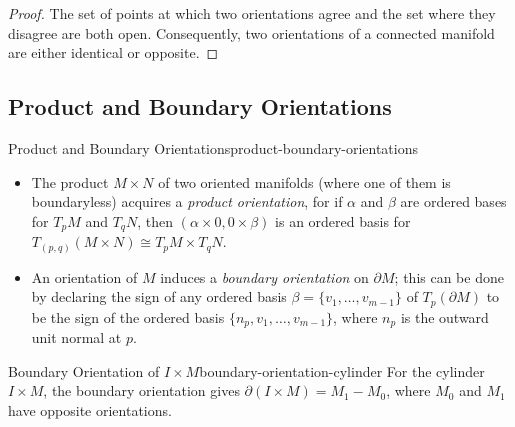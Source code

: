 \begin{proof}
    The set of points at which two orientations agree and the set where they disagree are both open. Consequently, two orientations of a connected manifold are either identical or opposite.
\end{proof}

\subsection{Product and Boundary Orientations}

\begin{remark}{Product and Boundary Orientations}{product-boundary-orientations}
    \begin{itemize}
        \item The product $M \times N$ of two oriented manifolds (where one of them is boundaryless) acquires a \emph{product orientation}, for if $\alpha$ and $\beta$ are ordered bases for $T_p M$ and $T_q N$, then $(\alpha \times 0, 0 \times \beta)$ is an ordered basis for $T_{(p,q)}(M \times N) \cong T_p M \times T_q N$.

        \item An orientation of $M$ induces a \emph{boundary orientation} on $\partial M$; this can be done by declaring the sign of any ordered basis $\beta = \{v_1, \ldots, v_{m-1}\}$ of $T_p(\partial M)$ to be the sign of the ordered basis $\{n_p, v_1, \ldots, v_{m-1}\}$, where $n_p$ is the outward unit normal at $p$.
    \end{itemize}
\end{remark}

\begin{example}{Boundary Orientation of $I \times M$}{boundary-orientation-cylinder}
    For the cylinder $I \times M$, the boundary orientation gives $\partial(I \times M) = M_1 - M_0$, where $M_0$ and $M_1$ have opposite orientations.
\end{example}

\begin{center}
\end{center}

